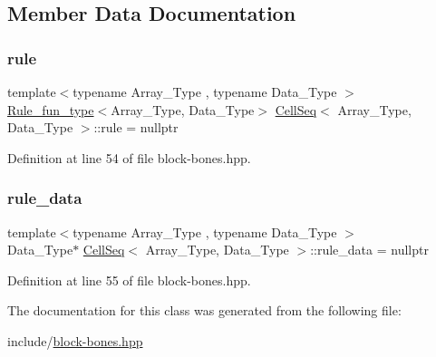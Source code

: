 \subsection{Member Data Documentation}
\mbox{\label{class_cell_seq_a96562d860b3e66a90330854ff9184ba5}} 
\subsubsection{\texorpdfstring{rule}{rule}}
{\footnotesize\ttfamily template$<$typename Array\+\_\+\+Type , typename Data\+\_\+\+Type $>$ \\
\hyperlink{typedefs_8hpp_a2e147c9c0e8b65be614c98a5dd400d5c}{Rule\+\_\+fun\+\_\+type}$<$Array\+\_\+\+Type, Data\+\_\+\+Type$>$ \hyperlink{class_cell_seq}{Cell\+Seq}$<$ Array\+\_\+\+Type, Data\+\_\+\+Type $>$\+::rule = nullptr\hspace{0.3cm}{\ttfamily [protected]}}



Definition at line 54 of file block-\/bones.\+hpp.

\mbox{\label{class_cell_seq_a543981f0422f690a3c52da29f82d8e0e}} 
\subsubsection{\texorpdfstring{rule\+\_\+data}{rule\_data}}
{\footnotesize\ttfamily template$<$typename Array\+\_\+\+Type , typename Data\+\_\+\+Type $>$ \\
Data\+\_\+\+Type$\ast$ \hyperlink{class_cell_seq}{Cell\+Seq}$<$ Array\+\_\+\+Type, Data\+\_\+\+Type $>$\+::rule\+\_\+data = nullptr\hspace{0.3cm}{\ttfamily [protected]}}



Definition at line 55 of file block-\/bones.\+hpp.



The documentation for this class was generated from the following file\+:\begin{DoxyCompactItemize}
\item 
include/\hyperlink{block-bones_8hpp}{block-\/bones.\+hpp}\end{DoxyCompactItemize}
